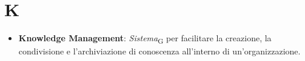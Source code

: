 \section{K}
\begin{itemize}
    \item \textbf{Knowledge Management}: \textit{Sistema}\textsubscript{G} per facilitare la creazione, la condivisione e l'archiviazione di conoscenza all'interno di un'organizzazione.
\end{itemize}
